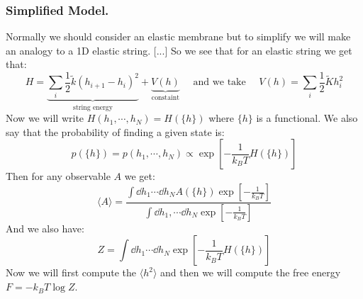 \documentclass[10pt,a4paper]{book}
\begin{document}
\subsubsection{Simplified Model.}
Normally we should consider an elastic membrane but to simplify we will make an analogy to a 1D elastic string. [...] So we see that for an elastic string we get that:
\[
H = \underbrace{\sum_i \frac{1}{2} \tilde{k} (h_{i+1} - h_i)^2}_{\text{string energy}} + \underbrace{V(h)}_{\text{constaint}} \quad \text{ and we take } \quad V(h) = \sum_i \frac{1}{2} \tilde{K} h_i^2
\]
Now we will write $H(h_1, \cdots, h_N) = H(\{h\})$ where $\{h\}$ is a functional. We also say that the probability of finding a given state is:
\[
p(\{h\}) = p(h_1, \cdots, h_N) \propto \exp[-\frac{1}{k_B T} H(\{h\})]
\]
Then for any observable $A$ we get:
\[
\langle A \rangle = \frac{\int \dd h_1 \cdots \dd h_N A(\{h\}) \exp[-\frac{1}{k_B T}]}{\int \dd h_1, \cdots \dd h_N \exp[-\frac{1}{k_B T}]}
\]
And we also have:
\[
Z = \int \dd h_1 \cdots \dd h_N \exp[-\frac{1}{k_B T} H(\{h\})]
\]
Now we will first compute the $\langle h^2 \rangle$ and then we will compute the free energy $F = -k_B T \log Z$.
\end{document}
